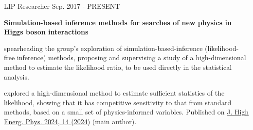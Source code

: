 
\begin{cventries}

    \cventry
    {LIP}
    {Researcher}
    {}
    {Sep. 2017 - PRESENT}
    {
        \textbf{Simulation-based inference methods for searches of new physics in Higgs boson interactions}\vspace{12pt}
        \begin{cvitems}      
            \item {spearheading the group's exploration of simulation-based-inference (likelihood-free inference) methods, proposing and supervising a study of a high-dimensional method to estimate the likelihood ratio, to be used directly in the statistical analysis.}
            \item {explored a high-dimensional method to estimate sufficient statistics of the likelihood, showing that it has competitive sensitivity to that from standard methods, based on a small set of physics-informed variables. Published on \href{https://doi.org/10.1007/JHEP04(2024)014}{J. High Energ. Phys. 2024, 14 (2024)} (main author).}
        \end{cvitems}
    }


\end{cventries}
